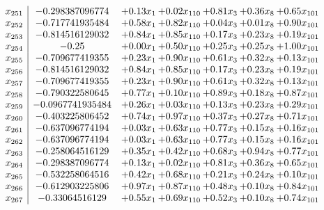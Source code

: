 \documentclass[8pt]{article}
\begin{document}
\[\begin{array}{c| c c@{\hskip 2pt} c@{\hskip 2pt} c@{\hskip 2pt} c@{\hskip 2pt} c@{\hskip 2pt} }
 x_{251}   &  -0.298387096774 & +  0.13 x_{1} & +  0.02 x_{110} & +  0.81 x_{3} & +  0.36 x_{8} & +  0.65 x_{101}\\
 x_{252}   &  -0.717741935484 & +  0.58 x_{1} & +  0.82 x_{110} & +  0.04 x_{3} & +  0.01 x_{8} & +  0.90 x_{101}\\
 x_{253}   &  -0.814516129032 & +  0.84 x_{1} & +  0.85 x_{110} & +  0.17 x_{3} & +  0.23 x_{8} & +  0.19 x_{101}\\
 x_{254}   &  -0.25 & +  0.00 x_{1} & +  0.50 x_{110} & +  0.25 x_{3} & +  0.25 x_{8} & +  1.00 x_{101}\\
 x_{255}   &  -0.709677419355 & +  0.23 x_{1} & +  0.90 x_{110} & +  0.61 x_{3} & +  0.32 x_{8} & +  0.13 x_{101}\\
 x_{256}   &  -0.814516129032 & +  0.84 x_{1} & +  0.85 x_{110} & +  0.17 x_{3} & +  0.23 x_{8} & +  0.19 x_{101}\\
 x_{257}   &  -0.709677419355 & +  0.23 x_{1} & +  0.90 x_{110} & +  0.61 x_{3} & +  0.32 x_{8} & +  0.13 x_{101}\\
 x_{258}   &  -0.790322580645 & +  0.77 x_{1} & +  0.10 x_{110} & +  0.89 x_{3} & +  0.18 x_{8} & +  0.87 x_{101}\\
 x_{259}   &  -0.0967741935484 & +  0.26 x_{1} & +  0.03 x_{110} & +  0.13 x_{3} & +  0.23 x_{8} & +  0.29 x_{101}\\
 x_{260}   &  -0.403225806452 & +  0.74 x_{1} & +  0.97 x_{110} & +  0.37 x_{3} & +  0.27 x_{8} & +  0.71 x_{101}\\
 x_{261}   &  -0.637096774194 & +  0.03 x_{1} & +  0.63 x_{110} & +  0.77 x_{3} & +  0.15 x_{8} & +  0.16 x_{101}\\
 x_{262}   &  -0.637096774194 & +  0.03 x_{1} & +  0.63 x_{110} & +  0.77 x_{3} & +  0.15 x_{8} & +  0.16 x_{101}\\
 x_{263}   &  -0.258064516129 & +  0.35 x_{1} & +  0.42 x_{110} & +  0.68 x_{3} & +  0.94 x_{8} & +  0.77 x_{101}\\
 x_{264}   &  -0.298387096774 & +  0.13 x_{1} & +  0.02 x_{110} & +  0.81 x_{3} & +  0.36 x_{8} & +  0.65 x_{101}\\
 x_{265}   &  -0.532258064516 & +  0.42 x_{1} & +  0.68 x_{110} & +  0.21 x_{3} & +  0.24 x_{8} & +  0.10 x_{101}\\
 x_{266}   &  -0.612903225806 & +  0.97 x_{1} & +  0.87 x_{110} & +  0.48 x_{3} & +  0.10 x_{8} & +  0.84 x_{101}\\
 x_{267}   &  -0.33064516129 & +  0.55 x_{1} & +  0.69 x_{110} & +  0.52 x_{3} & +  0.10 x_{8} & +  0.74 x_{101}\\

\end{array}\]
\end{document}
